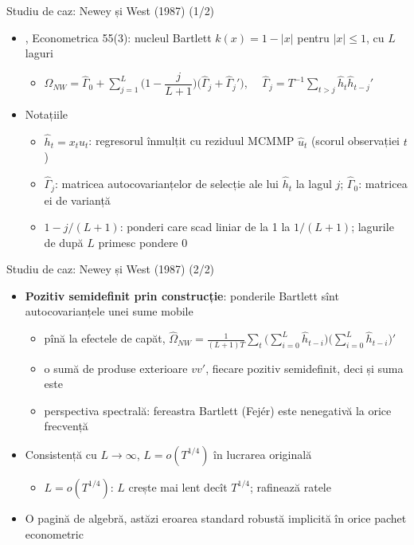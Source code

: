\begin{frame}{Studiu de caz: Newey și West (1987) (1/2)}
\itemsize{\small}
\begin{itemize}
    \item {}, Econometrica 55(3): nucleul Bartlett $k(x) = 1 - |x|$ pentru $|x| \le 1$, cu $L$ laguri
    \begin{itemize}
        \item $\hat\Omega_{NW} = \hat\Gamma_0 + \sum_{j=1}^{L}\Big(1 - \dfrac{j}{L+1}\Big)\big(\hat\Gamma_j + \hat\Gamma_j'\big)$, $\quad\hat\Gamma_j = T^{-1}\sum_{t>j}\hat h_t\hat h_{t-j}'$
    \end{itemize}
    \item Notațiile
    \begin{itemize}
        \item $\hat h_t = x_t\hat u_t$: regresorul înmulțit cu reziduul MCMMP $\hat u_t$ (scorul observației $t$)
        \item $\hat\Gamma_j$: matricea autocovarianțelor de selecție ale lui $\hat h_t$ la lagul $j$; $\hat\Gamma_0$: matricea ei de varianță
        \item $1 - j/(L+1)$: ponderi care scad liniar de la 1 la $1/(L+1)$; lagurile de după $L$ primesc pondere 0
    \end{itemize}
\end{itemize}
\end{frame}

\begin{frame}{Studiu de caz: Newey și West (1987) (2/2)}
\itemsize{\small}
\begin{itemize}
    \item \textbf{Pozitiv semidefinit prin construcție}: ponderile Bartlett sînt autocovarianțele unei sume mobile
    \begin{itemize}
        \item pînă la efectele de capăt, $\hat\Omega_{NW} = \frac{1}{(L+1)T}\sum_t\big(\sum_{i=0}^{L}\hat h_{t-i}\big)\big(\sum_{i=0}^{L}\hat h_{t-i}\big)'$
        \item o sumă de produse exterioare $vv'$, fiecare pozitiv semidefinit, deci și suma este
        \item perspectiva spectrală: fereastra Bartlett (Fejér) este nenegativă la orice frecvență
    \end{itemize}
    \item Consistență cu $L \to \infty$, $L = o(T^{1/4})$ în lucrarea originală
    \begin{itemize}
        \item $L = o(T^{1/4})$: $L$ crește mai lent decît $T^{1/4}$;  rafinează ratele
    \end{itemize}
    \item O pagină de algebră, astăzi eroarea standard robustă implicită în orice pachet econometric
\end{itemize}
\end{frame}

